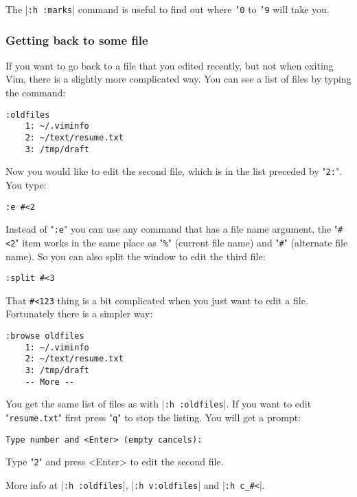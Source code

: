 The |\texttt{:h :marks}| command is useful to find out where \texttt{'0} to \texttt{'9} will take you.

\subsubsection{Getting back to some file}
If you want to go back to a file that you edited recently, but not when exiting Vim, there is a slightly more complicated way.
You can see a list of files by typing the command:

\begin{Verbatim}[samepage=true]
 :oldfiles
    1: ~/.viminfo 
    2: ~/text/resume.txt 
    3: /tmp/draft 
\end{Verbatim}

Now you would like to edit the second file, which is in the list preceded by "\texttt{2:}".
You type:

\begin{Verbatim}[samepage=true]
 :e #<2
\end{Verbatim}

Instead of "\texttt{:e}" you can use any command that has a file name argument, the "\texttt{\#<2}" item works in the same place as "\texttt{\%}" (current file name) and "\texttt{\#}" (alternate file name).
So you can also split the window to edit the third file:

\begin{Verbatim}[samepage=true]
 :split #<3
\end{Verbatim}

That \texttt{\#<123} thing is a bit complicated when you just want to edit a file.
Fortunately there is a simpler way:

\begin{Verbatim}[samepage=true]
 :browse oldfiles
    1: ~/.viminfo 
    2: ~/text/resume.txt 
    3: /tmp/draft 
    -- More --
\end{Verbatim}

You get the same list of files as with |\texttt{:h :oldfiles}|.
If you want to edit "\texttt{resume.txt}" first press "\texttt{q}" to stop the listing.
You will get a prompt:

\begin{Verbatim}[samepage=true]
    Type number and <Enter> (empty cancels): 
\end{Verbatim}

Type "\texttt{2}" and press <Enter> to edit the second file.

More info at |\texttt{:h :oldfiles}|, |\texttt{:h v:oldfiles}| and |\texttt{:h c\_\#<}|.
